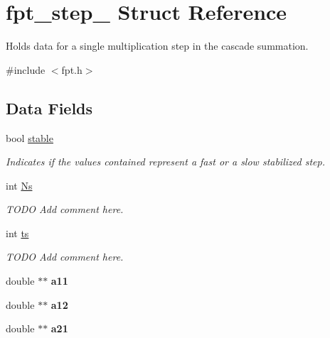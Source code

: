 \hypertarget{structfpt__step__}{\section{fpt\-\_\-step\-\_\- Struct Reference}
\label{structfpt__step__}
}


Holds data for a single multiplication step in the cascade summation.  




{\ttfamily \#include $<$fpt.\-h$>$}

\subsection*{Data Fields}
\begin{DoxyCompactItemize}
\item 
bool \hyperlink{structfpt__step___a71dc6483b4f3b958519bdafeae2c1dbf}{stable}
\begin{DoxyCompactList}\small\item\em Indicates if the values contained represent a fast or a slow stabilized step. \end{DoxyCompactList}\item 
int \hyperlink{structfpt__step___ac6767b7c6935b1f2af5dd54e2e8f690b}{Ns}
\begin{DoxyCompactList}\small\item\em T\-O\-D\-O Add comment here. \end{DoxyCompactList}\item 
int \hyperlink{structfpt__step___aeb754fe2aedc1f15cbb9c75c212772fb}{ts}
\begin{DoxyCompactList}\small\item\em T\-O\-D\-O Add comment here. \end{DoxyCompactList}\item 
\hypertarget{structfpt__step___a73bfb18a62b4b4db10c8ad32796fc1ca}{double $\ast$$\ast$ {\bfseries a11}}\label{structfpt__step___a73bfb18a62b4b4db10c8ad32796fc1ca}

\item 
\hypertarget{structfpt__step___a71db335416c48adbc118782261264d54}{double $\ast$$\ast$ {\bfseries a12}}\label{structfpt__step___a71db335416c48adbc118782261264d54}

\item 
\hypertarget{structfpt__step___ac1c8fe4ca38b68dd3dd9a6c51ae456b1}{double $\ast$$\ast$ {\bfseries a21}}\label{structfpt__step___ac1c8fe4ca38b68dd3dd9a6c51ae456b1}


\end{DoxyCompactItemize}
